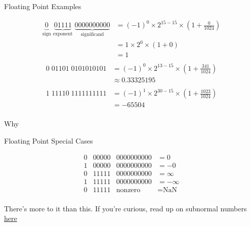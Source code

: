 \begin{frame}{Floating Point Examples}

    \begin{align*}
        \underbrace{0}_\text{sign} \; \underbrace{01111}_\text{exponent} \; \underbrace{0000000000}_\text{significand} & = (-1)^0 \times 2^{15 - 15} \times \left( 1 + \frac{0}{1024} \right) \\
                                                                                                                       & = 1 \times 2^0   \times \left( 1 + 0 \right)                         \\
                                                                                                                       & = 1                                                                  \\
    \end{align*}
    \begin{align*}
        0 \; 01101 \; 0101010101 & = (-1)^0 \times 2^{13 - 15} \times \left( 1 + \frac{341}{1024} \right) \\
                                 & \approx 0.33325195                                                     \\
    \end{align*}
    \begin{align*}
        1 \; 11110 \; 1111111111 & = (-1)^1 \times 2^{30 - 15} \times \left( 1 + \frac{1023}{1024} \right) \\
                                 & = -65504                                                                \\
    \end{align*}

    Why
\end{frame}

\begin{frame}{Floating Point Special Cases}

    \[
        \begin{array}{ccccr}
            0 & 00000 & 0000000000     & = 0          \\
            1 & 00000 & 0000000000     & = -0         \\
            0 & 11111 & 0000000000     & = \infty     \\
            1 & 11111 & 0000000000     & = -\infty    \\
            0 & 11111 & \text{nonzero} & = \text{NaN} \\
        \end{array}
    \]

    There's more to it than this. If you're curious, read up on subnormal numbers
    \href{https://en.wikipedia.org/wiki/Half-precision_floating-point_format}{here}

\end{frame}

